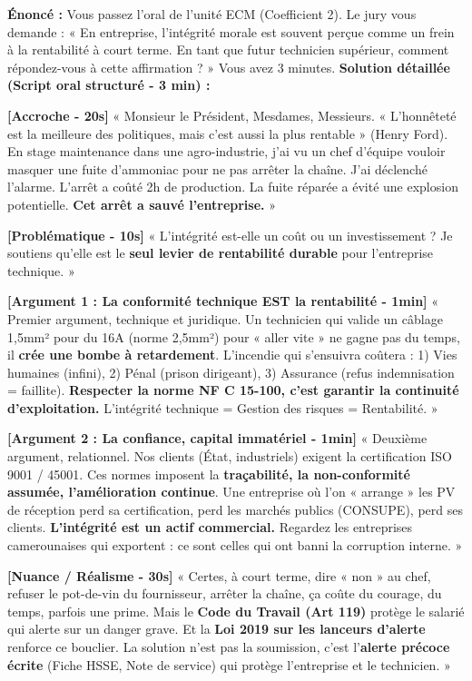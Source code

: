 \documentclass[11pt]{article}
\begin{document}
\begin{exoresolu}
    \textbf{Énoncé :} Vous passez l'oral de l'unité ECM (Coefficient 2). Le jury vous demande : « En entreprise, l'intégrité morale est souvent perçue comme un frein à la rentabilité à court terme. En tant que futur technicien supérieur, comment répondez-vous à cette affirmation ? » Vous avez 3 minutes.
    \tcblower
    \textbf{Solution détaillée (Script oral structuré - 3 min) :}

    \textbf{[Accroche - 20s]} « Monsieur le Président, Mesdames, Messieurs. « L'honnêteté est la meilleure des politiques, mais c'est aussi la plus rentable » (Henry Ford). En stage maintenance dans une agro-industrie, j'ai vu un chef d'équipe vouloir masquer une fuite d'ammoniac pour ne pas arrêter la chaîne. J'ai déclenché l'alarme. L'arrêt a coûté 2h de production. La fuite réparée a évité une explosion potentielle. \textbf{Cet arrêt a sauvé l'entreprise.} »

    \textbf{[Problématique - 10s]} « L'intégrité est-elle un coût ou un investissement ? Je soutiens qu'elle est le \textbf{seul levier de rentabilité durable} pour l'entreprise technique. »

    \textbf{[Argument 1 : La conformité technique EST la rentabilité - 1min]} « Premier argument, technique et juridique. Un technicien qui valide un câblage 1,5mm² pour du 16A (norme 2,5mm²) pour « aller vite » ne gagne pas du temps, il \textbf{crée une bombe à retardement}. L'incendie qui s'ensuivra coûtera : 1) Vies humaines (infini), 2) Pénal (prison dirigeant), 3) Assurance (refus indemnisation = faillite). \textbf{Respecter la norme NF C 15-100, c'est garantir la continuité d'exploitation.} L'intégrité technique = Gestion des risques = Rentabilité. »

    \textbf{[Argument 2 : La confiance, capital immatériel - 1min]} « Deuxième argument, relationnel. Nos clients (État, industriels) exigent la certification ISO 9001 / 45001. Ces normes imposent la \textbf{traçabilité, la non-conformité assumée, l'amélioration continue}. Une entreprise où l'on « arrange » les PV de réception perd sa certification, perd les marchés publics (CONSUPE), perd ses clients. \textbf{L'intégrité est un actif commercial.} Regardez les entreprises camerounaises qui exportent : ce sont celles qui ont banni la corruption interne. »

    \textbf{[Nuance / Réalisme - 30s]} « Certes, à court terme, dire « non » au chef, refuser le pot-de-vin du fournisseur, arrêter la chaîne, ça coûte du courage, du temps, parfois une prime. Mais le \textbf{Code du Travail (Art 119)} protège le salarié qui alerte sur un danger grave. Et la \textbf{Loi 2019 sur les lanceurs d'alerte} renforce ce bouclier. La solution n'est pas la soumission, c'est l'\textbf{alerte précoce écrite} (Fiche HSSE, Note de service) qui protège l'entreprise et le technicien. »


\end{exoresolu}
\end{document}
